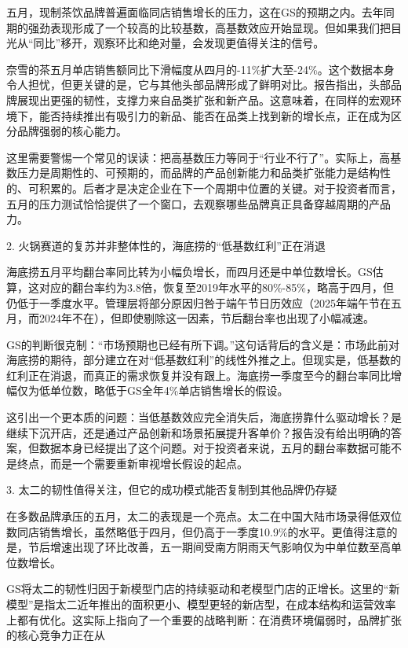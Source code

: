 \documentclass[11pt]{ctexart}
\begin{document}
五月，现制茶饮品牌普遍面临同店销售增长的压力，这在GS的预期之内。去年同期的强劲表现形成了一个较高的比较基数，高基数效应开始显现。但如果我们把目光从“同比”移开，观察环比和绝对量，会发现更值得关注的信号。

奈雪的茶五月单店销售额同比下滑幅度从四月的-11\%扩大至-24\%。这个数据本身令人担忧，但更关键的是，它与其他头部品牌形成了鲜明对比。报告指出，头部品牌展现出更强的韧性，支撑力来自品类扩张和新产品。这意味着，在同样的宏观环境下，能否持续推出有吸引力的新品、能否在品类上找到新的增长点，正在成为区分品牌强弱的核心能力。

这里需要警惕一个常见的误读：把高基数压力等同于“行业不行了”。实际上，高基数压力是周期性的、可预期的，而品牌的产品创新能力和品类扩张能力是结构性的、可积累的。后者才是决定企业在下一个周期中位置的关键。对于投资者而言，五月的压力测试恰恰提供了一个窗口，去观察哪些品牌真正具备穿越周期的产品力。

2. 火锅赛道的复苏并非整体性的，海底捞的“低基数红利”正在消退

海底捞五月平均翻台率同比转为小幅负增长，而四月还是中单位数增长。GS估算，这对应的翻台率约为3.8倍，恢复至2019年水平的80\%-85\%，略高于四月，但仍低于一季度水平。管理层将部分原因归咎于端午节日历效应（2025年端午节在五月，而2024年不在），但即使剔除这一因素，节后翻台率也出现了小幅减速。

GS的判断很克制：“市场预期也已经有所下调。”这句话背后的含义是：市场此前对海底捞的期待，部分建立在对“低基数红利”的线性外推之上。但现实是，低基数的红利正在消退，而真正的需求恢复并没有跟上。海底捞一季度至今的翻台率同比增幅仅为低单位数，略低于GS全年4\%单店销售增长的假设。

这引出一个更本质的问题：当低基数效应完全消失后，海底捞靠什么驱动增长？是继续下沉开店，还是通过产品创新和场景拓展提升客单价？报告没有给出明确的答案，但数据本身已经提出了这个问题。对于投资者来说，五月的翻台率数据可能不是终点，而是一个需要重新审视增长假设的起点。

3. 太二的韧性值得关注，但它的成功模式能否复制到其他品牌仍存疑

在多数品牌承压的五月，太二的表现是一个亮点。太二在中国大陆市场录得低双位数同店销售增长，虽然略低于四月，但仍高于一季度10.9\%的水平。更值得注意的是，节后增速出现了环比改善，五一期间受南方阴雨天气影响仅为中单位数至高单位数增长。

GS将太二的韧性归因于新模型门店的持续驱动和老模型门店的正增长。这里的“新模型”是指太二近年推出的面积更小、模型更轻的新店型，在成本结构和运营效率上都有优化。这实际上指向了一个重要的战略判断：在消费环境偏弱时，品牌扩张的核心竞争力正在从
\end{document}
